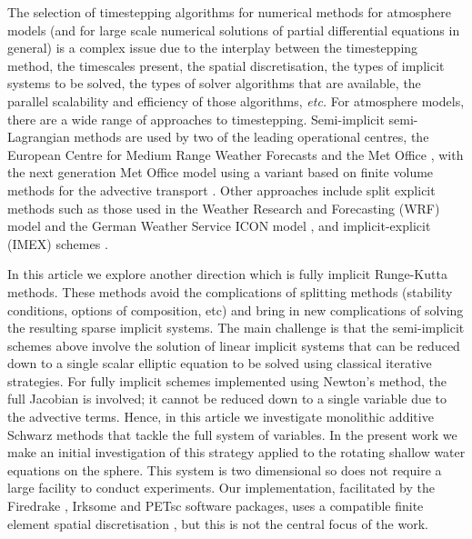 \documentclass[a4paper, 12pt]{article}
\begin{document}
The selection of timestepping algorithms for numerical methods for
atmosphere models (and for large scale numerical solutions of partial
differential equations in general) is a complex issue due to the
interplay between the timestepping method, the timescales present, the
spatial discretisation, the types of implicit systems to be solved,
the types of solver algorithms that are available, the parallel
scalability and efficiency of those algorithms, \emph{etc.} For
atmosphere models, there are a wide range of approaches to
timestepping. Semi-implicit semi-Lagrangian methods are used by two of
the leading operational centres, the European Centre for Medium Range
Weather Forecasts \citep{hortal2002development} and the Met Office
\citep{melvin2010inherently,wood2014inherently}, with the next
generation Met Office model using a variant based on finite volume
methods for the advective transport
\citep{melvin2019mixed,melvin2024mixed}. Other approaches include
split explicit methods \citep{klemp2007conservative} such as those
used in the Weather Research and Forecasting (WRF) model
\citep{skamarock2008description} and the German Weather Service ICON
model \citep{zangl2015icon}, and implicit-explicit (IMEX) schemes
\citep{vogl2019evaluation,giraldo2013implicit}.

In this article we explore another direction which is fully implicit
Runge-Kutta methods. These methods avoid the complications of
splitting methods (stability conditions, options of composition, etc)
and bring in new complications of solving the resulting sparse
implicit systems. The main challenge is that the semi-implicit schemes
above involve the solution of linear implicit systems that can be
reduced down to a single scalar elliptic equation to be solved using
classical iterative strategies. For fully implicit schemes implemented
using Newton's method, the full Jacobian is involved; it cannot be
reduced down to a single variable due to the advective terms. Hence,
in this article we investigate monolithic additive Schwarz methods
that tackle the full system of variables. In the present work we make
an initial investigation of this strategy applied to the rotating
shallow water equations on the sphere. This system is two dimensional
so does not require a large facility to conduct experiments. Our
implementation, facilitated by the Firedrake
\citep{FiredrakeUserManual}, Irksome \citep{farrell2021irksome} and
PETsc \citep{balay2019petsc} software packages, uses a compatible
finite element spatial discretisation \citep{cotter2023compatible},
but this is not the central focus of the work.
\end{document}
